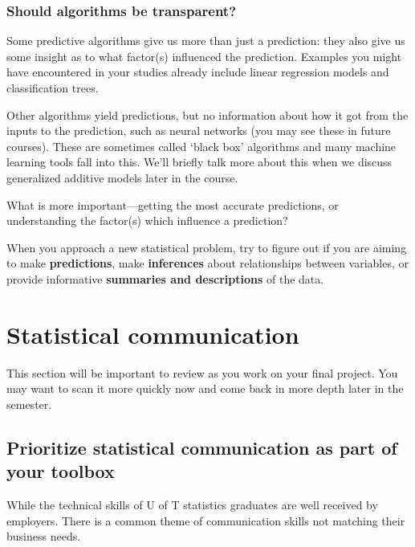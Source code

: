 \documentclass[
  openany]{book}
\begin{document}
\hypertarget{should-algorithms-be-transparent}{%
\subsubsection{Should algorithms be transparent?}\label{should-algorithms-be-transparent}}

Some predictive algorithms give us more than just a prediction: they also give us some
insight as to what factor(s) influenced the prediction. Examples you might have encountered in your studies already include linear regression models and classification trees.

Other algorithms yield predictions, but no information about how it got from the inputs
to the prediction, such as neural networks (you may see these in future courses). These are sometimes called `black box' algorithms and many machine learning tools fall into this. We'll briefly talk more about this when we discuss generalized additive models later in the course.

What is more important---getting the most accurate predictions, or understanding the factor(s) which influence a prediction?

When you approach a new statistical problem, try to figure out if you are aiming to make \textbf{predictions}, make \textbf{inferences} about relationships between variables, or provide informative \textbf{summaries and descriptions} of the data.

\hypertarget{statistical-communication}{%
\section{Statistical communication}\label{statistical-communication}}

This section will be important to review as you work on your final project. You may want to scan it more quickly now and come back in more depth later in the semester.

\hypertarget{prioritize-statistical-communication-as-part-of-your-toolbox}{%
\subsection{Prioritize statistical communication as part of your toolbox}\label{prioritize-statistical-communication-as-part-of-your-toolbox}}

While the technical skills of U of T statistics graduates are well received by employers. There is a common theme of communication skills not matching their business needs.
\end{document}
